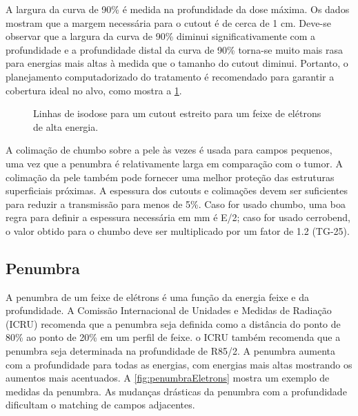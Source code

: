 \documentclass[11pt,a4paper]{article}
\newcounter{exemplo}
\begin{document}
	
	A largura da curva de 90\% é medida na profundidade da dose máxima. Os dados mostram que a margem necessária para o cutout é de cerca de 1 cm. Deve-se observar que a largura da curva de 90\% diminui significativamente com a profundidade e a profundidade distal da curva de 90\% torna-se muito mais rasa para energias mais altas à medida que o tamanho do cutout diminui. Portanto, o planejamento computadorizado do tratamento é recomendado para garantir a cobertura ideal no alvo, como mostra a \ref{fig:isodoseCutout}. 
	
	\begin{figure}[h]
		\centering
		\caption{Linhas de isodose para um cutout estreito para um feixe de elétrons de alta energia.}
		\label{fig:isodoseCutout}
	\end{figure}
	
	A colimação de chumbo sobre a pele às vezes é usada para campos pequenos, uma vez que a penumbra é relativamente larga em comparação com o tumor. A colimação da pele também pode fornecer uma melhor proteção das estruturas superficiais próximas. A espessura dos cutouts e colimações devem ser suficientes para reduzir a transmissão para menos de 5\%. Caso for usado chumbo, uma boa regra para definir a espessura necessária em mm é E/2; caso for usado cerrobend, o valor obtido para o chumbo deve ser multiplicado por um fator de 1.2 (TG-25).

\subsection*{Penumbra}

	A penumbra de um feixe de elétrons é uma função da energia feixe e da profundidade. A Comissão Internacional de Unidades e Medidas de Radiação (ICRU) recomenda que a penumbra seja definida como a distância do ponto de 80\% ao ponto de 20\% em um perfil de feixe. o ICRU também recomenda que a penumbra seja determinada na profundidade de R85/2. A penumbra aumenta com a profundidade para todas as energias, com energias mais altas mostrando os aumentos mais acentuados. A \ref{fig:penumbraEletrons} mostra um exemplo de medidas da penumbra. As mudanças drásticas da penumbra com a profundidade dificultam o matching de campos adjacentes.
\end{document}
